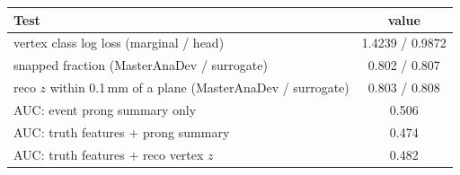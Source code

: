 \begin{tabular}{lc}
\toprule
Test & value \\
\midrule
vertex class log loss (marginal / head) & 1.4239 / 0.9872 \\
snapped fraction (MasterAnaDev / surrogate) & 0.802 / 0.807 \\
reco $z$ within 0.1\,mm of a plane (MasterAnaDev / surrogate) & 0.803 / 0.808 \\
\midrule
AUC: event prong summary only & 0.506 \\
AUC: truth features + prong summary & 0.474 \\
AUC: truth features + reco vertex $z$ & 0.482 \\
\bottomrule
\end{tabular}
